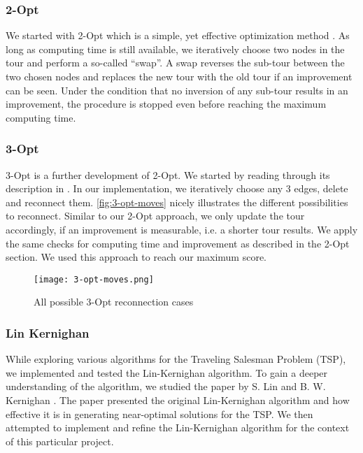 \documentclass{article}
\begin{document}
\subsubsection{2-Opt} \label{2-opt}
We started with 2-Opt which is a simple, yet effective optimization method \cite{lecture_notes}. As long as computing time is still available, we iteratively choose two nodes in the tour and perform a so-called ``swap''. A swap reverses the sub-tour between the two chosen nodes and replaces the new tour with the old tour if an improvement can be seen. Under the condition that no inversion of any sub-tour results in an improvement, the procedure is stopped even before reaching the maximum computing time.

\subsubsection{3-Opt}
3-Opt is a further development of 2-Opt. We started by reading through its description in \cite{lecture_notes}. In our implementation, we iteratively choose any 3 edges, delete and reconnect them. \autoref{fig:3-opt-moves} nicely illustrates the different possibilities to reconnect. Similar to our 2-Opt approach, we only update the tour accordingly, if an improvement is measurable, i.e. a shorter tour results. We apply the same checks for computing time and improvement as described in the 2-Opt section. We used this approach to reach our maximum score.
\begin{figure}[h]
  \centering
  \texttt{[image: 3-opt-moves.png]} %
  \caption{All possible 3-Opt reconnection cases \cite{article}}
  \label{fig:3-opt-moves}
\end{figure}


\subsubsection{Lin Kernighan} \label{sec:linKernighan}
While exploring various algorithms for the Traveling Salesman Problem (TSP), we implemented and tested the Lin-Kernighan algorithm. To gain a deeper understanding of the algorithm, we studied the paper  by S. Lin and B. W. Kernighan \cite{lin_effective_1973}. The paper presented the original Lin-Kernighan algorithm and how effective it is in generating near-optimal solutions for the TSP. We then attempted to implement and refine the Lin-Kernighan algorithm for the context of this particular project. 
\end{document}

